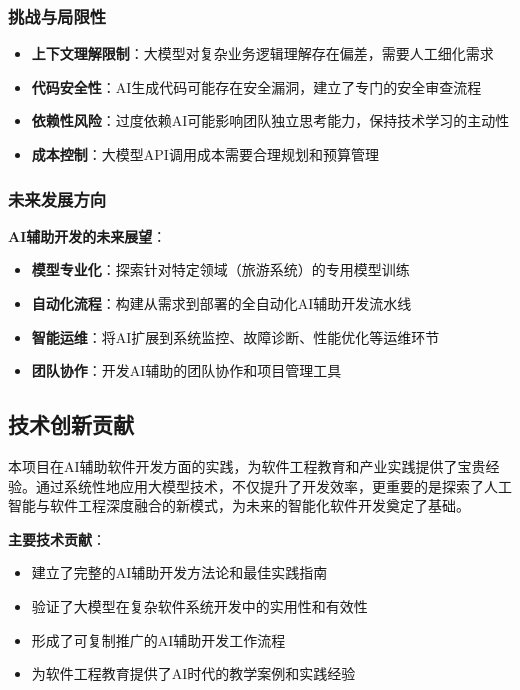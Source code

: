 \documentclass[12pt,a4paper]{article}
\begin{document}
\subsubsection{挑战与局限性}

\begin{warningbox}[title={AI辅助开发的挑战与应对}]
\begin{itemize}[nosep]
    \item \textbf{上下文理解限制}：大模型对复杂业务逻辑理解存在偏差，需要人工细化需求
    \item \textbf{代码安全性}：AI生成代码可能存在安全漏洞，建立了专门的安全审查流程
    \item \textbf{依赖性风险}：过度依赖AI可能影响团队独立思考能力，保持技术学习的主动性
    \item \textbf{成本控制}：大模型API调用成本需要合理规划和预算管理
\end{itemize}
\end{warningbox}

\subsubsection{未来发展方向}

\textbf{AI辅助开发的未来展望}：
\begin{itemize}
    \item \textbf{模型专业化}：探索针对特定领域（旅游系统）的专用模型训练
    \item \textbf{自动化流程}：构建从需求到部署的全自动化AI辅助开发流水线
    \item \textbf{智能运维}：将AI扩展到系统监控、故障诊断、性能优化等运维环节
    \item \textbf{团队协作}：开发AI辅助的团队协作和项目管理工具
\end{itemize}

\subsection{技术创新贡献}

\begin{infobox}[title={AI辅助开发模式的创新价值}]
本项目在AI辅助软件开发方面的实践，为软件工程教育和产业实践提供了宝贵经验。通过系统性地应用大模型技术，不仅提升了开发效率，更重要的是探索了人工智能与软件工程深度融合的新模式，为未来的智能化软件开发奠定了基础。
\end{infobox}

\textbf{主要技术贡献}：
\begin{itemize}
    \item 建立了完整的AI辅助开发方法论和最佳实践指南
    \item 验证了大模型在复杂软件系统开发中的实用性和有效性
    \item 形成了可复制推广的AI辅助开发工作流程
    \item 为软件工程教育提供了AI时代的教学案例和实践经验
\end{itemize}
\end{document}
